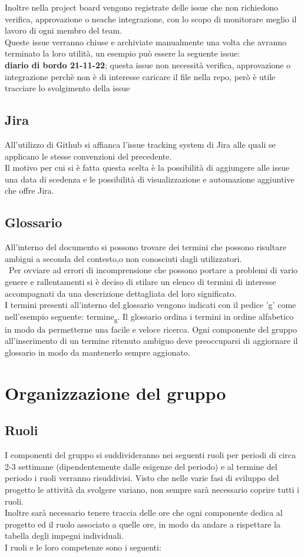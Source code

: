 Inoltre nella project board vengono registrate delle issue che non richiedono verifica, approvazione o neache integrazione, con lo scopo di monitorare meglio il lavoro di ogni membro del team.\\
Queste issue verranno chiuse e archiviate manualmente una volta che avranno terminato la loro utilità, un esempio può essere la seguente issue:\\
\textbf{diario di bordo 21-11-22}; questa issue non necessità verifica, approvazione o integrazione perchè non è di interesse caricare il file nella repo, però è utile tracciare lo svolgimento della issue

\subsection{Jira}
All'utilizzo di Github si affianca l'issue tracking system di Jira alle quali se applicano le stesse convenzioni del precedente.\\
Il motivo per cui si è fatta questa scelta è la possibilità di aggiungere alle issue una data di scedenza e le possibilità di visualizzazione e automazione aggiuntive che offre Jira.


\subsection{Glossario}
All'interno del documento si possono trovare dei termini che possono risultare ambigui a seconda del contesto,o non conosciuti dagli utilizzatori.\\\
Per ovviare ad errori di incomprensione che possono portare a problemi di vario genere e rallentamenti si è deciso di stilare un elenco di termini 
di interesse accompagnati da una descrizione dettagliata del loro significato.\\
I termini presenti all'interno del glossario vengono indicati con il pedice 'g' come nell'esempio seguente: termine\textsubscript{g}.
Il glossario ordina i termini in ordine alfabetico in modo da permetterne una facile e veloce ricerca.
Ogni componente del gruppo all'inserimento di un termine ritenuto ambiguo deve preoccuparsi di aggiornare il glossario in modo da mantenerlo sempre aggionato.

\section{Organizzazione del gruppo}
\subsection{Ruoli}
I componenti del gruppo si suddivideranno nei seguenti ruoli per periodi di circa 2-3 settimane (dipendentemente dalle esigenze del periodo) e al termine del periodo i ruoli verranno risuddivisi. 
Visto che nelle varie fasi di sviluppo del progetto le attività da svolgere variano, non sempre sarà necessario coprire tutti i ruoli.\\
Inoltre sarà necessario tenere traccia delle ore che ogni componente dedica al progetto ed il ruolo associato a quelle ore, in modo da andare a rispettare la tabella degli impegni individuali.\\
I ruoli e le loro competenze sono i seguenti:

